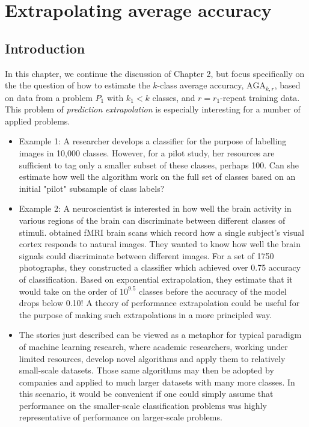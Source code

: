 
\chapter{Extrapolating average accuracy} %

\newcommand{\skone}{\mathcal{S}_{k_1}}
\newcommand{\sktwo}{\mathcal{S}_{k_2}}


\label{Chapter3} %

\section{Introduction}

In this chapter, we continue the discussion of Chapter 2, but focus
specifically on the the question of how to estimate the $k$-class
average accuracy, $\text{AGA}_{k, r}$, based on data from a problem
$P_1$ with $k_1 < k$ classes, and $r = r_1$-repeat training data.
This problem of \emph{prediction extrapolation} is especially
interesting for a number of applied problems.

\begin{itemize} 
\item Example 1: A researcher develops a classifier for the purpose of labelling
images in 10,000 classes. However, for a pilot study, her resources are sufficient to 
tag only a smaller subset of these classes, perhaps 100. Can she estimate how well the algorithm 
work on the full set of classes based on an initial "pilot" subsample of class labels?
\item Example 2: A neuroscientist is interested in how well the brain
  activity in various regions of the brain can discriminate between
  different classes of stimuli.  \cite{Kay2008a} obtained fMRI brain
  scans which record how a single subject's visual cortex responds to
  natural images. They wanted to know how well the brain signals could
  discriminate between different images. For a set of 1750
  photographs, they constructed a classifier which achieved over 0.75
  accuracy of classification. Based on exponential extrapolation, they
  estimate that it would take on the order of $10^{9.5}$ classes
  before the accuracy of the model drops below 0.10!  A theory of
  performance extrapolation could be useful for the purpose of making
  such extrapolations in a more principled way.
\item The stories just described can be viewed as a metaphor for
  typical paradigm of machine learning research, where academic
  researchers, working under limited resources, develop novel
  algorithms and apply them to relatively small-scale datasets. Those
  same algorithms may then be adopted by companies and applied to much
  larger datasets with many more classes. In this scenario, it would
  be convenient if one could simply assume that performance on the
  smaller-scale classification problems was highly representative of
  performance on larger-scale problems.
\end{itemize}

